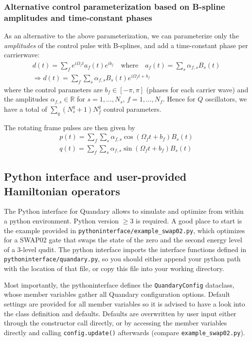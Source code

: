\documentclass[11pt]{article}
\newcommand{\R}{\mathds{R}}
\begin{document}
  \subsubsection{Alternative control parameterization based on B-spline amplitudes and time-constant phases}
  As an alternative to the above parameterization, we can parameterize only the \textit{amplitudes} of the control pulse with B-splines, and add a time-constant phase per carrierwave:
  \begin{align}
    d(t) = \sum_f e^{i\Omega_f t} a_f(t)e^{ib_f} \quad \text{where} \quad a_f(t) = \sum_s \alpha_{f,s} B_s(t) \\
    \Rightarrow d(t)= \sum_f\sum_s \alpha_{f,s}B_s(t)e^{i\Omega_ft + b_f}
  \end{align}
  where the control parameters are $b_f\in [-\pi, \pi]$ (phases for each carrier wave) and the amplitudes $\alpha_{f,s}\in \R$ for $s=1,\dots, N_s$, $f=1,\dots, N_f$. Hence for $Q$ oscillators, we have a total of $\sum_q (N_s^q + 1) N_f^q$ control parameters.

  The rotating frame pulses are then given by 
  \begin{align}
    p(t) = \sum_f \sum_s \alpha_{f,s} \cos(\Omega_f t + b_f) B_s(t) \\
    q(t) = \sum_f \sum_s \alpha_{f,s} \sin(\Omega_f t + b_f) B_s(t)
  \end{align}


\subsection{Python interface and user-provided Hamiltonian operators}
The Python interface for Quandary allows to simulate and optimize from within a python environment. Python version $\geq 3$ is required.
A good place to start is the example provided in \texttt{pythoninterface/example\_swap02.py}, which optimizes for a SWAP02 gate that swaps the state of the zero and the second energy level of a 3-level qudit. 
The python interface imports the interface functions defined in \texttt{pythoninterface/quandary.py}, so you should either append your python path with the location of that file, or copy this file into your working directory.

Most importantly, the pythoninterface defines the \texttt{QuandaryConfig} dataclass, whose member variables gather all Quandary configuration options. Default settings are provided for all member variables so it is advised to have a look into the class definition and defaults. Defaults are overwritten by user input either through the constructor call directly, or by accessing the member variables directly and calling \texttt{config.update()} afterwards (compare \texttt{example\_swap02.py}). 
\end{document}
